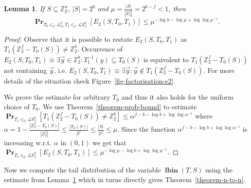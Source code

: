 \documentclass{article}
\newcommand{\lbin}[2]{\operatorname{\mathbf{lbin}}({#1}, {#2})}
\newcommand{\vecspace}[2]{\mathbb{Z}_{#1}^{#2}}
\newcommand{\binvecspace}[1]{\vecspace{2}{#1}}
\newcommand{\linearmaps}[2]{\mathcal{L}_{#1}^{#2}}
\newcommand{\surjectivelinearmaps}[2]{\mathcal{LS}_{#1}^{#2}}
\newcommand{\probs}[2]{\operatorname{\mathbf{Pr}}_{{#1}}\left[{#2}\right]}
\newtheorem{lemma}{Lemma}
\begin{document}
\begin{lemma}
\label{lemma-bound}
If $S \subseteq \binvecspace{u}$, $|S| = 2^b$ and $\mu = \frac{|S|}{|\binvecspace{f}|} = 2^{b - f} < 1$, then
\[
\probs{T_0 \in_U \linearmaps{u}{f}, T_1 \in_U \surjectivelinearmaps{f}{b}}{E_2(S, T_0, T_1)} \leq \mu ^ {-\log b - \log \mu + \log \log \mu^{-1}}.
\]
\end{lemma}
\begin{proof}
Observe that it is possible to restate $E_2(S, T_0, T_1)$ as $T_1(\binvecspace{f} - T_0(S)) \neq \binvecspace{b}$. 
Occurrence of $E_2(S, T_0, T_1) \equiv \exists \vec{y} \in \binvecspace{b} \colon T_1^{-1}(y) \subseteq T_0(S)$ is equivalent to $T_1(\binvecspace{f} - T_0(S))$ not containing $\vec{y}$, i.e. $E_2(S, T_0, T_1) \equiv \exists \vec{y} \colon \vec{y} \not\in T_1(\binvecspace{f} - T_0(S))$.
For more details of the situation check Figure~\ref{fig-factorisation-e2}.

We prove the estimate for arbitrary $T_0$ and thus it also holds for the uniform choice of $T_0$. 
We use Theorem~\ref{theorem-prob-bound} to estimate $\probs{T_1\in_U \surjectivelinearmaps{f}{b}}{T_1(\binvecspace{f} - T_0(S)) \neq \binvecspace{b}} \leq \alpha ^ {f - b - \log b + \log \log \alpha^{-1}}$ where $\alpha = 1 - \frac{|\binvecspace{f} - T_0(S)|}{|\binvecspace{f}|} \leq \frac{|T_0(S)|}{2^f} \leq \frac{|S|}{2^f} \leq \mu$.
Since the function $\alpha ^ {f - b - \log b + \log \log \alpha^{-1}}$ is increasing w.r.t. $\alpha$ in $(0, 1)$ we get that
$
\probs{T_1 \in_U \surjectivelinearmaps{f}{b}}{E_2(S, T_0, T_1)} \leq \mu ^ {-\log \mu - \log b + \log \log \mu^{-1}}.
$
\end{proof} 

Now we compute the tail distribution of the variable $\lbin{T}{S}$ using the estimate from Lemma~\ref{lemma-bound} which in turns directly gives Theorem~\ref{theorem-n-to-n}.
\end{document}
